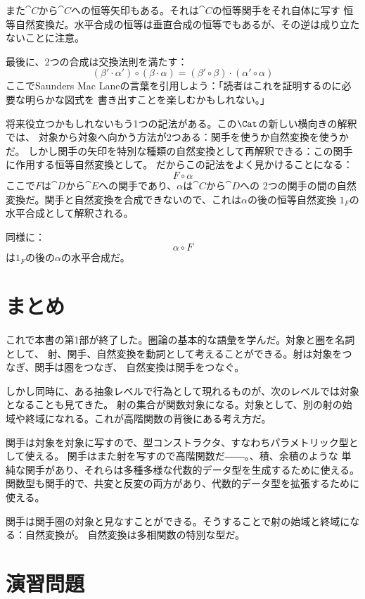 また$\cat{C}$から$\cat{C}$への恒等矢印もある。それは$\cat{C}$の恒等関手をそれ自体に写す
恒等自然変換だ。水平合成の恒等は垂直合成の恒等でもあるが、その逆は成り立たないことに注意。

最後に、2つの合成は交換法則を満たす：
\[(\beta' \cdot \alpha') \circ (\beta \cdot \alpha) = (\beta' \circ \beta) \cdot (\alpha' \circ \alpha)\]
ここでSaunders Mac Laneの言葉を引用しよう：「読者はこれを証明するのに必要な明らかな図式を
書き出すことを楽しむかもしれない。」

将来役立つかもしれないもう1つの記法がある。この$\Cat$の新しい横向きの解釈では、
対象から対象へ向かう方法が2つある：関手を使うか自然変換を使うかだ。
しかし関手の矢印を特別な種類の自然変換として再解釈できる：この関手に作用する恒等自然変換として。
だからこの記法をよく見かけることになる：
\[F \circ \alpha\]
ここで$F$は$\cat{D}$から$\cat{E}$への関手であり、$\alpha$は$\cat{C}$から$\cat{D}$への
2つの関手の間の自然変換だ。関手と自然変換を合成できないので、これは$\alpha$の後の恒等自然変換
$1_F$の水平合成として解釈される。

同様に：
\[\alpha \circ F\]
は$1_F$の後の$\alpha$の水平合成だ。

\section{まとめ}

これで本書の第1部が終了した。圏論の基本的な語彙を学んだ。対象と圏を名詞として、
射、関手、自然変換を動詞として考えることができる。射は対象をつなぎ、関手は圏をつなぎ、
自然変換は関手をつなぐ。

しかし同時に、ある抽象レベルで行為として現れるものが、次のレベルでは対象となることも見てきた。
射の集合が関数対象になる。対象として、別の射の始域や終域になれる。これが高階関数の背後にある考え方だ。

関手は対象を対象に写すので、型コンストラクタ、すなわちパラメトリック型として使える。
関手はまた射を写すので高階関数だ――。、積、余積のような
単純な関手があり、それらは多種多様な代数的データ型を生成するために使える。
関数型も関手的で、共変と反変の両方があり、代数的データ型を拡張するために使える。

関手は関手圏の対象と見なすことができる。そうすることで射の始域と終域になる：自然変換が。
自然変換は多相関数の特別な型だ。

\section{演習問題}

